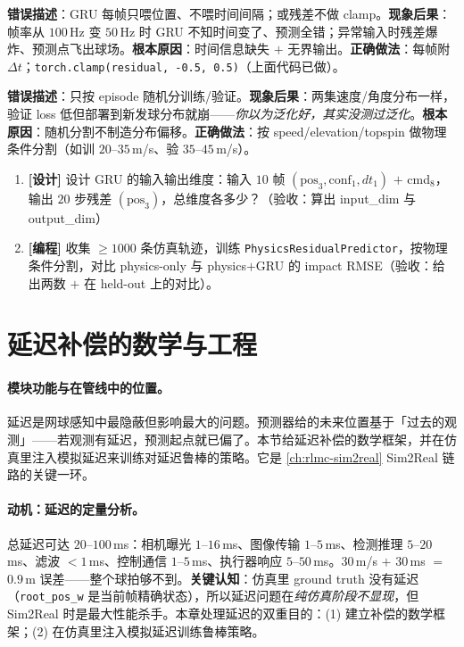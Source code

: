 \begin{pitfall}
\textbf{错误描述}：GRU 每帧只喂位置、不喂时间间隔；或残差不做 clamp。\textbf{现象后果}：帧率从 $100$\,Hz 变 $50$\,Hz 时 GRU 不知时间变了、预测全错；异常输入时残差爆炸、预测点飞出球场。\textbf{根本原因}：时间信息缺失 $+$ 无界输出。\textbf{正确做法}：每帧附 $\Delta t$；\verb|torch.clamp(residual, -0.5, 0.5)|（上面代码已做）。
\end{pitfall}

\begin{pitfall}
\textbf{错误描述}：只按 episode 随机分训练/验证。\textbf{现象后果}：两集速度/角度分布一样，验证 loss 低但部署到新发球分布就崩——\emph{你以为泛化好，其实没测过泛化}。\textbf{根本原因}：随机分割不制造分布偏移。\textbf{正确做法}：按 speed/elevation/topspin 做物理条件分割（如训 $20$--$35$\,m/s、验 $35$--$45$\,m/s）。
\end{pitfall}

\begin{practice}[本节动手任务]
\begin{enumerate}
  \item \textbf{[设计]} 设计 GRU 的输入输出维度：输入 $10$ 帧 $(\text{pos}_3,\text{conf}_1,dt_1)$ $+$ cmd$_8$，输出 $20$ 步残差 $(\text{pos}_3)$，总维度各多少？（验收：算出 input\_dim 与 output\_dim）
  \item \textbf{[编程]} 收集 $\ge 1000$ 条仿真轨迹，训练 \verb|PhysicsResidualPredictor|，按物理条件分割，对比 physics-only 与 physics$+$GRU 的 impact RMSE（验收：给出两数 $+$ 在 held-out 上的对比）。
\end{enumerate}
\end{practice}

\section{延迟补偿的数学与工程}
\label{sec:rlmc-perc-delay}

\paragraph{模块功能与在管线中的位置。}延迟是网球感知中最隐蔽但影响最大的问题。预测器给的未来位置基于「过去的观测」——若观测有延迟，预测起点就已偏了。本节给延迟补偿的数学框架，并在仿真里注入模拟延迟来训练对延迟鲁棒的策略。它是 \cref{ch:rlmc-sim2real} Sim2Real 链路的关键一环。

\paragraph{动机：延迟的定量分析。}总延迟可达 $20$--$100$\,ms：相机曝光 $1$--$16$\,ms、图像传输 $1$--$5$\,ms、检测推理 $5$--$20$\,ms、滤波 $<1$\,ms、控制通信 $1$--$5$\,ms、执行器响应 $5$--$50$\,ms。$30$\,m/s $+$ $30$\,ms $=$ $0.9$\,m 误差——整个球拍够不到。\textbf{关键认知}：仿真里 ground truth 没有延迟（\verb|root_pos_w| 是当前帧精确状态），所以延迟问题在\emph{纯仿真阶段不显现}，但 Sim2Real 时是最大性能杀手。本章处理延迟的双重目的：(1) 建立补偿的数学框架；(2) 在仿真里注入模拟延迟训练鲁棒策略。

